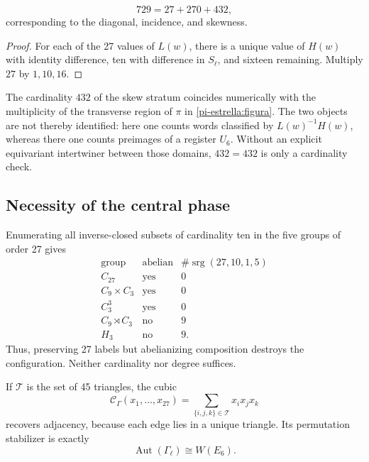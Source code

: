 \begin{theorem}
\label{p12-83-c20-s6:thm:particion-hensel-schlafli-nueva}
\begin{equation}
 729=27+270+432,
 \label{p12-83-c20-s6:eq:particion-729-e6-nueva}
\end{equation}
corresponding to the diagonal, incidence, and skewness.
\end{theorem}

\begin{proof}
For each of the 27 values of \(L(w)\), there is a unique value of
\(H(w)\) with identity difference, ten with difference in \(S_\ell\), and
sixteen remaining. Multiply \(27\) by \(1,10,16\).
\end{proof}

The cardinality \(432\) of the skew stratum coincides numerically with the
multiplicity of the transverse region of \(\pi\) in
\cref{pi-estrella:figura}. The two objects are not thereby identified: here
one counts words classified by \(L(w)^{-1}H(w)\), whereas there one
counts preimages of a register \(U_6\). Without an explicit equivariant
intertwiner between those domains, \(432=432\) is only a cardinality check.



\subsection{Necessity of the central phase}

Enumerating all inverse-closed subsets of cardinality ten
in the five groups of order 27 gives
\[
\begin{array}{c|c|c}
\text{group}&\text{abelian}&
\#\operatorname{srg}(27,10,1,5)\\ \hline
C_{27}&\text{yes}&0\\
C_9\times C_3&\text{yes}&0\\
C_3^3&\text{yes}&0\\
C_9\rtimes C_3&\text{no}&9\\
H_3&\text{no}&9.
\end{array}
\]
Thus, preserving 27 labels but abelianizing composition destroys the
configuration. Neither cardinality nor degree suffices.

If \(\mathcal T\) is the set of 45 triangles, the cubic
\[
 \mathcal C_\Gamma(x_1,\ldots,x_{27})
 =\sum_{\{i,j,k\}\in\mathcal T}x_ix_jx_k
\]
recovers adjacency, because each edge lies in a unique triangle. Its
permutation stabilizer is exactly
\[
 \operatorname{Aut}(\Gamma_\ell)\cong W(E_6).
\]

